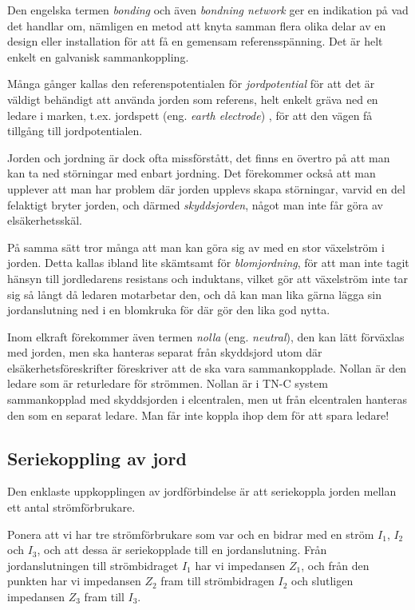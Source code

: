 Den engelska termen \emph{bonding} och även \emph{bondning network} ger en
indikation på vad det handlar om, nämligen en metod att knyta samman flera
olika delar av en design eller installation för att få en gemensam
referensspänning. Det är helt enkelt en galvanisk sammankoppling.

Många gånger kallas den referenspotentialen för \emph{jordpotential} för att
det är väldigt behändigt att använda jorden som referens, helt enkelt gräva ned
en ledare i marken, t.ex. jordspett (eng. \emph{earth electrode})
\cite[3.1.2]{K27-1991}, för att den vägen få tillgång till jordpotentialen.

Jorden och jordning är dock ofta missförstått, det finns en övertro på att man
kan ta ned störningar med enbart jordning. Det förekommer också att man
upplever att man har problem där jorden upplevs skapa störningar, varvid en
del felaktigt bryter jorden, och därmed \emph{skyddsjorden}, något man inte
får göra av elsäkerhetsskäl.

På samma sätt tror många att man kan göra sig av med en stor växelström i
jorden. Detta kallas ibland lite skämtsamt för \emph{blomjordning}, för att
man inte tagit hänsyn till jordledarens resistans och induktans, vilket gör
att växelström inte tar sig så långt då ledaren motarbetar den, och då kan man
lika gärna lägga sin jordanslutning ned i en blomkruka för där gör den lika
god nytta.

Inom elkraft förekommer även termen \emph{nolla} (eng. \emph{neutral}), den
kan lätt förväxlas med jorden, men ska hanteras separat från skyddsjord utom
där elsäkerhetsföreskrifter föreskriver att de ska vara sammankopplade.
Nollan är den ledare som är returledare för strömmen. Nollan är i TN-C system
sammankopplad med skyddsjorden i elcentralen, men ut från elcentralen hanteras
den som en separat ledare. Man får inte koppla ihop dem för att spara ledare!

\subsection{Seriekoppling av jord}

Den enklaste uppkopplingen av jordförbindelse är att seriekoppla jorden
\cite[3]{ott1988} mellan ett antal strömförbrukare.

Ponera att vi har tre strömförbrukare som var och en bidrar med en ström
\(I_1\), \(I_2\) och \(I_3\), och att dessa är seriekopplade till en
jordanslutning. Från jordanslutningen till strömbidraget \(I_1\) har vi
impedansen \(Z_1\), och från den punkten har vi impedansen \(Z_2\) fram till
strömbidragen \(I_2\) och slutligen impedansen \(Z_3\) fram till \(I_3\).

